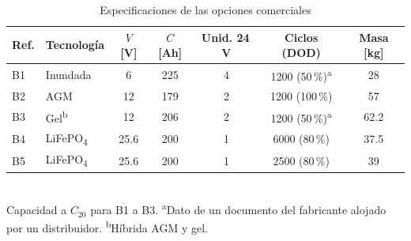 \begin{table}[!ht]
\caption{Especificaciones de las opciones comerciales}
\label{tab:opciones}
\centering
\footnotesize
\setlength{\tabcolsep}{2.2pt}
\begin{tabular}{l l c c c c c}
\toprule
Ref. & Tecnología & $V$ [V] & $C$ [Ah] & Unid. 24\,V & Ciclos (DOD) & Masa [kg] \\
\midrule
B1 & Inundada & 6 & 225 & 4 & 1200 (50\,\%)\textsuperscript{a} & 28 \\
B2 & AGM & 12 & 179 & 2 & 1200 (100\,\%) & 57 \\
B3 & Gel\textsuperscript{b} & 12 & 206 & 2 & 1200 (50\,\%)\textsuperscript{a} & 62.2 \\
B4 & LiFePO\textsubscript{4} & 25.6 & 200 & 1 & 6000 (80\,\%) & 37.5 \\
B5 & LiFePO\textsubscript{4} & 25.6 & 200 & 1 & 2500 (80\,\%) & 39 \\
\bottomrule
\end{tabular}
\\[2pt]
{\footnotesize Capacidad a $C_{20}$ para B1 a B3. \textsuperscript{a}Dato de un documento del fabricante alojado por un distribuidor. \textsuperscript{b}Híbrida AGM y gel.}
\end{table}